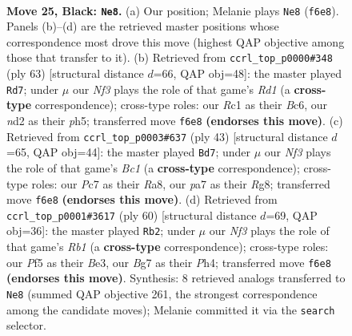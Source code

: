 \documentclass[11pt]{article}
\begin{document}
\clearpage

\begin{figure}[p]\centering
\begin{subfigure}{0.46\textwidth}\centering
\resizebox{\linewidth}{!}{%
\newchessgame
\chessboard[
  setfen={r5k1/P1p3bp/1p3np1/5p2/4pP1P/R5P1/3NR1BK/2r5 b - - 3 25},
  showmover=false,
  pgfstyle=straightmove, color=movearrow, markmove={f6-e8}
]}
\caption{}
\end{subfigure}\hfill
\begin{subfigure}{0.46\textwidth}\centering
\resizebox{\linewidth}{!}{%
\newchessgame
\chessboard[
  setfen={3r1k2/p4pp1/2b4p/1p2P2P/2pn1PR1/8/P4KP1/1B1R4 b - - 7 32},
  showmover=false,
  pgfstyle=straightmove, color=movearrow, markmove={d8-d7}
]}
\caption{}
\end{subfigure}
\\[4pt]
\begin{subfigure}{0.46\textwidth}\centering
\resizebox{\linewidth}{!}{%
\newchessgame
\chessboard[
  setfen={r1b3r1/4kp1p/1p2p3/p1npP3/3N1P2/6RB/PPP4P/2K4R b - - 5 22},
  showmover=false,
  pgfstyle=straightmove, color=movearrow, markmove={c8-d7}
]}
\caption{}
\end{subfigure}\hfill
\begin{subfigure}{0.46\textwidth}\centering
\resizebox{\linewidth}{!}{%
\newchessgame
\chessboard[
  setfen={1r2b1k1/R1nr2pp/2p5/2P2p2/1P1PpP1P/2N1B2P/8/1R2K3 w - - 6 31},
  showmover=false,
  pgfstyle=straightmove, color=movearrow, markmove={b1-b2}
]}
\caption{}
\end{subfigure}
\caption{\textbf{Move 25, Black: \texttt{Ne8}.} (a) Our position; Melanie plays \texttt{Ne8} (\texttt{f6e8}). Panels (b)--(d) are the retrieved master positions whose correspondence most drove this move (highest QAP objective among those that transfer to it). (b) Retrieved from \texttt{ccrl\_top\_p0000\#348} (ply 63) [structural distance $d$=66, QAP obj=48]: the master played \texttt{Rd7}; under $\mu$ our \emph{Nf3} plays the role of that game's \emph{Rd1} (a \textbf{cross-type} correspondence); cross-type roles: our \emph{R}c1 as their \emph{B}c6, our \emph{n}d2 as their \emph{p}h5; transferred move \texttt{f6e8} \textbf{(endorses this move)}. (c) Retrieved from \texttt{ccrl\_top\_p0003\#637} (ply 43) [structural distance $d$=65, QAP obj=44]: the master played \texttt{Bd7}; under $\mu$ our \emph{Nf3} plays the role of that game's \emph{Bc1} (a \textbf{cross-type} correspondence); cross-type roles: our \emph{P}c7 as their \emph{R}a8, our \emph{p}a7 as their \emph{R}g8; transferred move \texttt{f6e8} \textbf{(endorses this move)}. (d) Retrieved from \texttt{ccrl\_top\_p0001\#3617} (ply 60) [structural distance $d$=69, QAP obj=36]: the master played \texttt{Rb2}; under $\mu$ our \emph{Nf3} plays the role of that game's \emph{Rb1} (a \textbf{cross-type} correspondence); cross-type roles: our \emph{P}f5 as their \emph{B}e3, our \emph{B}g7 as their \emph{P}h4; transferred move \texttt{f6e8} \textbf{(endorses this move)}. Synthesis: 8 retrieved analogs transferred to \texttt{Ne8} (summed QAP objective 261, the strongest correspondence among the candidate moves); Melanie committed it via the \texttt{search} selector.}
\label{fig:thought-m49}
\end{figure}
\end{document}
